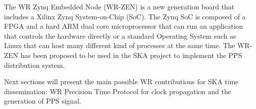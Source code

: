The WR Zynq Embedded Node (WR-ZEN) is a new generation board that includes a Xilinx Zynq System-on-Chip (SoC). The Zynq SoC is composed of a FPGA and a hard ARM dual core microprocessor that can run an application that controls the hardware directly or a standard Operating System such as Linux that can host many different kind of processes at the same time. The WR-ZEN has been proposed to be used in the SKA project to implement the PPS distribution system.

Next sections will present the main possible WR contributions for SKA time dissemination: WR Precision Time Protocol for clock propagation and the generation of PPS signal. 

